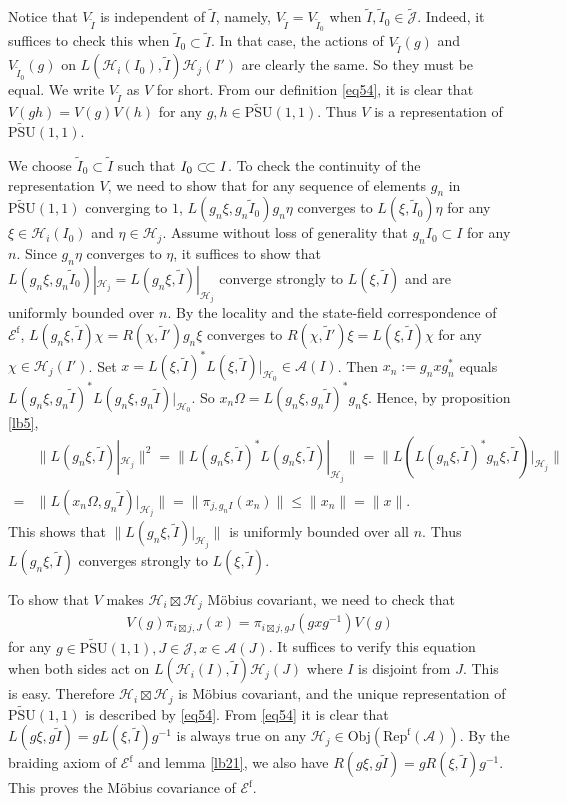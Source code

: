 \documentclass[12pt,a4paper]{article}
\theoremstyle{definition}
\theoremstyle{plain}
\newcommand{\mc}{\mathcal}
\newcommand{\wtd}{\widetilde}
\newcommand{\UPSU}{\widetilde{\mathrm{PSU}}(1,1)}
\newcommand{\Jtd}{\widetilde{\mathcal J}}
\newcommand{\RepfA}{\mathrm{Rep}^{\mathrm f}(\mc A)}
\newcommand{\Obj}{\mathrm{Obj}}
\newcommand{\Ef}{\mathscr E^{\mathrm f}}
\numberwithin{equation}{section}
\begin{document}
Notice that $V_{\wtd I}$ is independent of $\wtd I$, namely, $V_{\wtd I}=V_{\wtd I_0}$ when $\wtd I,\wtd I_0\in\Jtd$. Indeed, it suffices to check this when $\wtd I_0\subset \wtd I$. In that case, the actions of $V_{\wtd I}(g)$ and $V_{\wtd I_0}(g)$ on $L(\mc H_i(I_0),\wtd I)\mc H_j(I')$ are clearly the same. So they must be equal. We write $V_{\wtd I}$ as $V$ for short. From our definition \eqref{eq54}, it is clear that $V(gh)=V(g)V(h)$ for any $g,h\in\UPSU$. Thus $V$ is a representation of $\UPSU$.

We choose $\wtd I_0\subset \wtd I$ such that $I_0\subset\joinrel\subset I$.  To check the continuity of the representation $V$, we need to show that for any sequence of elements $g_n$ in $\UPSU$ converging to $1$, $L(g_n\xi,g_n\wtd I_0)g_n\eta$ converges to $L(\xi,\wtd I_0)\eta$ for any $\xi\in\mc H_i(I_0)$ and $\eta\in\mc H_j$. Assume without loss of generality that $g_nI_0\subset I$ for any $n$. Since $g_n\eta$ converges to $\eta$, it suffices to show that $L(g_n\xi,g_n\wtd I_0)|_{\mc H_j}=L(g_n\xi,\wtd I)|_{\mc H_j}$ converge strongly to $L(\xi,\wtd I)$ and are uniformly bounded over $n$. By the locality and the state-field correspondence of $\Ef$,  $L(g_n\xi,\wtd I)\chi=R(\chi,\wtd I')g_n\xi$ converges to $R(\chi,\wtd I')\xi=L(\xi,\wtd I)\chi$ for any $\chi\in\mc H_j(I')$. Set $x=L(\xi,\wtd I)^*L(\xi, \wtd I)|_{\mc H_0}\in\mc A(I)$. Then $x_n:=g_nxg_n^*$ equals $L(g_n\xi,g_n\wtd I)^*L(g_n\xi, g_n\wtd I)|_{\mc H_0}$. So $x_n\Omega=L(g_n\xi,g_n\wtd I)^*g_n\xi$. Hence, by proposition \ref{lb5},
\begin{align*}
&\lVert L(g_n\xi,\wtd I)|_{\mc H_j} \lVert^2=\lVert L(g_n\xi,\wtd I)^*L(g_n\xi,\wtd I)|_{\mc H_j} \lVert=\lVert L(L(g_n\xi,\wtd I)^*g_n\xi,\wtd I)|_{\mc H_j} \lVert\\
=&\lVert L(x_n\Omega,g_n\wtd I)|_{\mc H_j} \lVert=\lVert \pi_{j,g_nI}(x_n) \lVert\leq \lVert x_n \lVert=\lVert x\lVert.
\end{align*}
This shows that $\lVert L(g_n\xi,\wtd I)|_{\mc H_j} \lVert$ is uniformly bounded over all $n$. Thus $L(g_n\xi,\wtd I)$ converges strongly to $L(\xi,\wtd I)$.


To show that $V$ makes $\mc H_i\boxtimes\mc H_j$ M\"obius covariant, we need to check that
\begin{align*}
V(g)\pi_{i\boxtimes j,J}(x)=\pi_{i\boxtimes j,gJ}(gxg^{-1})V(g)
\end{align*}
for any $g\in\UPSU,J\in\mc J,x\in\mc A(J)$. It suffices to verify this equation when both sides act on $L(\mc H_i(I),\wtd I)\mc H_j(J)$ where $I$ is disjoint from $J$. This is easy. Therefore $\mc H_i\boxtimes\mc H_j$ is M\"obius covariant, and the unique representation of $\UPSU$ is described by \eqref{eq54}. From \eqref{eq54} it is clear that $L(g\xi,g\wtd I)=gL(\xi,\wtd I)g^{-1}$ is always true on any $\mc H_j\in\Obj(\RepfA)$. By the braiding axiom of $\Ef$ and lemma \ref{lb21}, we also have $R(g\xi,g\wtd I)=gR(\xi,\wtd I)g^{-1}$. This proves the M\"obius covariance of $\Ef$.
\end{document}
